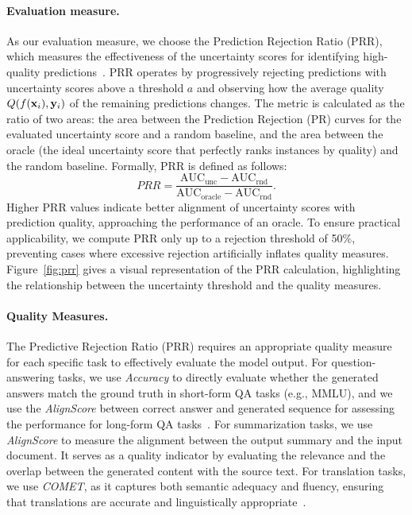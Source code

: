 \paragraph{Evaluation measure.}
  As our evaluation measure, we choose the Prediction Rejection Ratio (PRR), which measures the effectiveness of the uncertainty scores for identifying high-quality predictions~\citep{malinin2020uncertainty}. PRR operates by progressively rejecting predictions with uncertainty scores above a threshold $a$ and observing how the average quality $Q(f(\mathbf{x}_i), \mathbf{y}_i)$ of the remaining predictions changes. The metric is calculated as the ratio of two areas: the area between the Prediction Rejection (PR) curves for the evaluated uncertainty score and a random baseline, and the area between the oracle (the ideal uncertainty score that perfectly ranks instances by quality) and the random baseline. Formally, PRR is defined as follows:
    \begin{equation}
    PRR = \frac{\text{AUC}_{\text{unc}}-\text{AUC}_{\text{rnd}}}{\text{AUC}_{\text{oracle}}-\text{AUC}_{\text{rnd}}}.
  \label{eq:prr}
  \end{equation}
  Higher PRR values indicate better alignment of uncertainty scores with prediction quality, approaching the performance of an oracle. To ensure practical applicability, we compute PRR only up to a rejection threshold of 50\%, preventing cases where excessive rejection artificially inflates quality measures. Figure~\ref{fig:prr} gives a visual representation of the PRR calculation, highlighting the relationship between the uncertainty threshold and the quality measures.

  

\paragraph{Quality Measures.}
  The Predictive Rejection Ratio (PRR) requires an appropriate quality measure for each specific task to effectively evaluate the model output. For question-answering tasks, we use \textit{Accuracy} to directly evaluate whether the generated answers match the ground truth in short-form QA tasks (e.g., MMLU), and we use the \textit{AlignScore} between correct answer and generated sequence for assessing the performance for long-form QA tasks~\citep{zha2023alignscore}. For summarization tasks, we use  \textit{AlignScore} to measure the alignment between the output summary and the input document. It serves as a quality indicator by evaluating the relevance and the overlap between the generated content with the source text. For translation tasks, we use \textit{COMET}, as it captures both semantic adequacy and fluency, ensuring that translations are accurate and linguistically appropriate~\citep{rei-etal-2020-comet}. 

